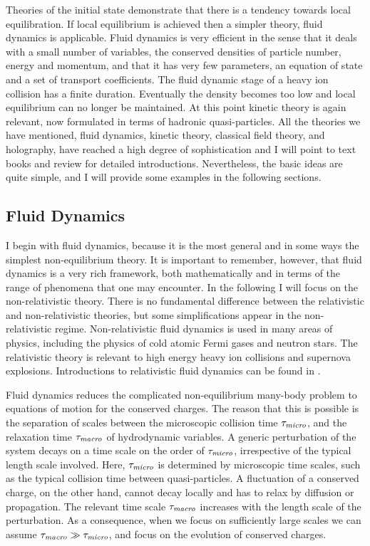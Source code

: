  Theories of the initial state demonstrate that there is a tendency
towards local equilibration. If local equilibrium is achieved then a 
simpler theory, fluid dynamics is applicable. Fluid dynamics is 
very efficient in the sense that it deals with a small number of 
variables, the conserved densities of particle number, energy and 
momentum, and that it has very few parameters, an equation of state 
and a set of transport coefficients. The fluid dynamic stage of a 
heavy ion collision has a finite duration. Eventually the density
becomes too low and local equilibrium can no longer be maintained. 
At this point kinetic theory is again relevant, now formulated in
terms of hadronic quasi-particles. All the theories we have 
mentioned, fluid dynamics, kinetic theory, classical field theory, 
and holography, have reached a high degree of sophistication and
I will point to text books and review for detailed introductions.
Nevertheless, the basic ideas are quite simple, and I will provide
some examples in the following sections.
 

\subsection{Fluid Dynamics}
\label{sec_hydro}

 I begin with fluid dynamics, because it is the most general and in some 
ways the simplest non-equilibrium theory. It is important to remember, 
however, that fluid dynamics is a very rich framework, both mathematically 
and in terms of the range of phenomena that one may encounter. In the 
following I will focus on the non-relativistic theory. There is no 
fundamental difference between the relativistic and non-relativistic 
theories, but some simplifications appear in the non-relativistic regime. 
Non-relativistic fluid dynamics is used in many areas of physics, including 
the physics of cold atomic Fermi gases and neutron stars. The relativistic 
theory is relevant to high energy heavy ion collisions and supernova 
explosions. Introductions to relativistic fluid dynamics can be found in
\cite{Romatschke:2009im,Rezzolla:2013,Jeon:2015dfa}.

 Fluid dynamics reduces the complicated non-equilibrium many-body
problem to equations of motion for the conserved charges. The 
reason that this is possible is the separation of scales between
the microscopic collision time $\tau_{\it micro}$, and the relaxation
time $\tau_{\it macro}$ of hydrodynamic variables. A generic perturbation
of the system decays on a time scale on the order of $\tau_{\it micro}$,
irrespective of the typical length scale involved. Here, $\tau_{\it micro}$
is determined by microscopic time scales, such as the typical collision
time between quasi-particles. A fluctuation of a conserved charge, on 
the other hand, cannot decay locally and has to relax by diffusion or 
propagation. The relevant time scale $\tau_{\it macro}$ increases with 
the length scale of the perturbation. As a consequence, when we focus 
on sufficiently large scales we can assume $\tau_{\it macro}\gg 
\tau_{\it micro}$, and focus on the evolution of conserved charges. 

